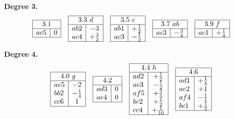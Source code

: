 \documentclass[11pt]{article}
\begin{document}
\noindent\textbf{Degree 3.}
\[
\begin{array}{|l|c|}\hline
\multicolumn{2}{|c|}{3.1}\\\hline
ac5 & 0 \\\hline
\end{array}\quad
\begin{array}{|l|c|}\hline
\multicolumn{2}{|c|}{3.3\ d}\\\hline
ab2 & -3 \\
ac4 & +\tfrac{3}{2} \\\hline
\end{array}\quad
\begin{array}{|l|c|}\hline
\multicolumn{2}{|c|}{3.5\ e}\\\hline
ab1 & +\tfrac{1}{2} \\
ac3 & -\tfrac{1}{2} \\\hline
\end{array}\quad
\begin{array}{|l|c|}\hline
\multicolumn{2}{|c|}{3.7\ ab}\\\hline
ac3 & -\tfrac{3}{4} \\\hline
\end{array}\quad
\begin{array}{|l|c|}\hline
\multicolumn{2}{|c|}{3.9\ f}\\\hline
ac1 & +\tfrac{1}{4} \\\hline
\end{array}
\]

\noindent\textbf{Degree 4.}
\[
\begin{array}{|l|c|}\hline
\multicolumn{2}{|c|}{4.0\ g}\\\hline
ae5 & -2 \\
bb2 & -\tfrac{1}{4} \\
cc6 & 1 \\\hline
\end{array}\quad
\begin{array}{|l|c|}\hline
\multicolumn{2}{|c|}{4.2}\\\hline
ad3 & 0 \\
ae4 & 0 \\\hline
\end{array}\quad
\begin{array}{|l|c|}\hline
\multicolumn{2}{|c|}{4.4\ h}\\\hline
ad2 & +\tfrac{1}{2} \\
ae3 & -\tfrac{1}{2} \\
af5 & +\tfrac{3}{5} \\
be2 & +\tfrac{1}{2} \\
cc4 & +\tfrac{1}{10} \\\hline
\end{array}\quad
\begin{array}{|l|c|}\hline
\multicolumn{2}{|c|}{4.6}\\\hline
ad1 & +\tfrac{1}{4} \\
ae2 & +1 \\
af4 & -\tfrac{1}{5} \\
bc1 & +\tfrac{1}{2} \\\hline
\end{array}
\]
\end{document}
